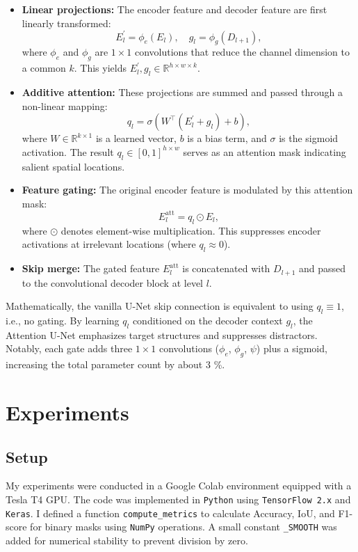 \documentclass[11pt]{article}
\begin{document}
\begin{itemize}
    \item \textbf{Linear projections:} The encoder feature and decoder feature are first linearly transformed:
    \[
    E_l^\prime = \phi_e(E_l), \quad g_l = \phi_g(D_{l+1}),
    \]
    where $\phi_e$ and $\phi_g$ are $1 \times 1$ convolutions that reduce the channel dimension to a common $k$. This yields $E_l^\prime, g_l \in \mathbb{R}^{h \times w \times k}$.
    
    \item \textbf{Additive attention:} These projections are summed and passed through a non-linear mapping:
    \[
    q_l = \sigma\left( W^\top (E_l^\prime + g_l) + b \right),
    \]
    where $W \in \mathbb{R}^{k \times 1}$ is a learned vector, $b$ is a bias term, and $\sigma$ is the sigmoid activation. The result $q_l \in [0,1]^{h \times w}$ serves as an attention mask indicating salient spatial locations.
    
    \item \textbf{Feature gating:} The original encoder feature is modulated by this attention mask:
    \[
    E_l^{\text{att}} = q_l \odot E_l,
    \]
    where $\odot$ denotes element-wise multiplication. This suppresses encoder activations at irrelevant locations (where $q_l \approx 0$).
    
    \item \textbf{Skip merge:} The gated feature $E_l^{\text{att}}$ is concatenated with $D_{l+1}$ and passed to the convolutional decoder block at level $l$.
\end{itemize}

Mathematically, the vanilla U-Net skip connection is equivalent to using $q_l \equiv 1$, i.e., no gating. By learning $q_l$ conditioned on the decoder context $g_l$, the Attention U-Net emphasizes target structures and suppresses distractors. Notably, each gate adds three $1\times1$ convolutions ($\phi_e$, $\phi_g$, $\psi$) plus a sigmoid, increasing the total parameter count by about 3 \%.



\section{Experiments}
\label{sec:Experiments}

\subsection{Setup}
\label{sec:Setup}
My experiments were conducted in a Google Colab environment equipped with a Tesla T4 GPU. The code was implemented in \texttt{Python} using \texttt{TensorFlow 2.x} and \texttt{Keras}. I defined a function \texttt{compute\_metrics} to calculate Accuracy, IoU, and F1-score for binary masks using \texttt{NumPy} operations. A small constant \texttt{\_SMOOTH} was added for numerical stability to prevent division by zero.
\end{document}
